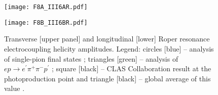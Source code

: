 


\begin{figure}[!t]
\centerline{%
\texttt{[image: F8A\_III6AR.pdf]}}

\centerline{%
\texttt{[image: F8B\_III6BR.pdf]}}
%
\caption{\label{A12S12}
%
Transverse [upper panel] and longitudinal [lower] Roper resonance electrocoupling helicity amplitudes.
Legend:
circles [blue] -- analysis of single-pion final states \cite{Aznauryan:2008pe, Aznauryan:2009mx};
triangles [green] -- analysis of $ep\to e^\prime \pi^+ \pi^- p^\prime$ \cite{Mokeev:2012vsa, Mokeev:2015lda};
square [black] -- CLAS Collaboration result at the photoproduction point \cite{Dugger:2009pn} and
triangle [black] -- global average of this value \cite{Olive:2016xmw}.
}
\end{figure}

